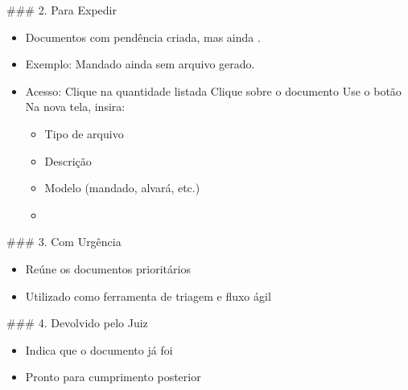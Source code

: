 \documentclass[letterpaper,10pt,brazil]{sphinxmanual}
\begin{document}
\sphinxAtStartPar
\#\#\# 2. Para Expedir
\begin{itemize}
\item {} 
\sphinxAtStartPar
Documentos com pendência criada, mas ainda .

\item {} 
\sphinxAtStartPar
Exemplo: Mandado ainda sem arquivo gerado.

\item {} 
\sphinxAtStartPar
Acesso:
\sphinxhyphen{} Clique na quantidade listada
\sphinxhyphen{} Clique sobre o documento
\sphinxhyphen{} Use o botão 
\sphinxhyphen{} Na nova tela, insira:
\begin{itemize}
\item {} 
\sphinxAtStartPar
Tipo de arquivo

\item {} 
\sphinxAtStartPar
Descrição

\item {} 
\sphinxAtStartPar
Modelo (mandado, alvará, etc.)

\end{itemize}
\begin{itemize}
\item {} 
\sphinxAtStartPar
{}

\end{itemize}

\end{itemize}

\sphinxAtStartPar
\#\#\# 3. Com Urgência
\begin{itemize}
\item {} 
\sphinxAtStartPar
Reúne os documentos prioritários

\item {} 
\sphinxAtStartPar
Utilizado como ferramenta de triagem e fluxo ágil

\end{itemize}

\sphinxAtStartPar
\#\#\# 4. Devolvido pelo Juiz
\begin{itemize}
\item {} 
\sphinxAtStartPar
Indica que o documento já foi 

\item {} 
\sphinxAtStartPar
Pronto para cumprimento posterior

\end{itemize}
\end{document}

